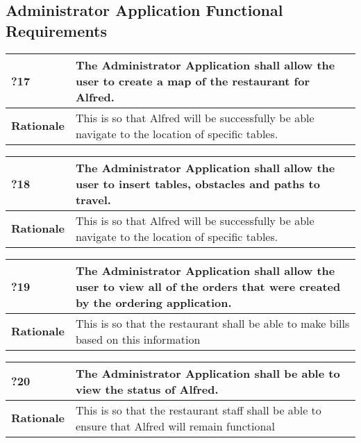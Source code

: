 \documentclass [11pt]{article}
\begin{document}
\subsection{Administrator Application Functional Requirements}

\begin{longtable}{| p{ } | p{ } | }\hline 
	\rowcolor{tableCell}\textbf{?17} & The Administrator Application shall allow the user to create a map of the restaurant for Alfred. \\ \hline
	\textbf{Rationale} &  This is so that Alfred will be successfully be able navigate to the location of specific tables.\\ \hline 
\end{longtable}

\begin{longtable}{| p{ } | p{ } | }\hline 
	\rowcolor{tableCell}\textbf{?18} & The Administrator Application shall allow the user to insert tables, obstacles and paths to travel. \\ \hline
	\textbf{Rationale} &  This is so that Alfred will be successfully be able navigate to the location of specific tables.\\ \hline 
\end{longtable}

\begin{longtable}{| p{ } | p{ } | }\hline 
	\rowcolor{tableCell}\textbf{?19} & The Administrator Application shall allow the user to view all of the orders that were created by the ordering application. \\ \hline
	\textbf{Rationale} &  This is so that the restaurant shall be able to make bills based on this information\\ \hline 
\end{longtable}

\begin{longtable}{| p{ } | p{ } | }\hline 
	\rowcolor{tableCell}\textbf{?20} & The Administrator Application shall be able to view the status of Alfred. \\ \hline
	\textbf{Rationale} &  This is so that the restaurant staff shall be able to ensure that Alfred will remain functional\\ \hline 
\end{longtable}
\end{document}

